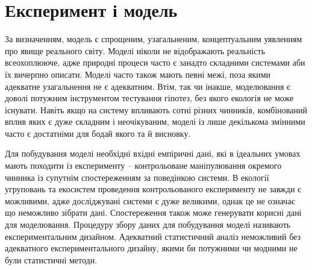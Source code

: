 \documentclass[
  11pt,
]{book}
\begin{document}
\section{Експеримент і модель}\label{stat-models}

За визначенням, модель є спрощеним, узагальненим, концептуальним уявленням про явище реального світу. Моделі ніколи не відображають реальність всеохоплююче, адже природні процеси часто є занадто складними системами аби їх вичерпно описати. Моделі часто також мають певні межі, поза якими адекватне узагальнення не є адекватним. Втім, так чи інакше, моделювання є доволі потужним інструментом тестування гіпотез, без якого екологія не може існувати. Навіть якщо на систему впливають сотні різних чинників, комбінований вплив яких є дуже складним і неочікуваним, моделі із лише декількома змінними часто є достатніми для бодай якого та й висновку.

Для побудування моделі необхідні вхідні емпіричні дані, які в ідеальних умовах мають походити із експерименту -- контрольоване маніпулювання окремого чинника із супутнім спостереженням за поведінкою системи. В екології угруповань та екосистем проведення контрольованого експерименту не завжди є можливими, адже досліджувані системи є дуже великими, однак це не означає що неможливо зібрати дані. Спостереження також може генерувати корисні дані для моделювання. Процедуру збору даних для побудування моделі називають експериментальним дизайном. Адекватний статистичний аналіз неможливий без адекватного експериментального дизайну, якими би потужними чи модними не були статистичні методи.
\end{document}
